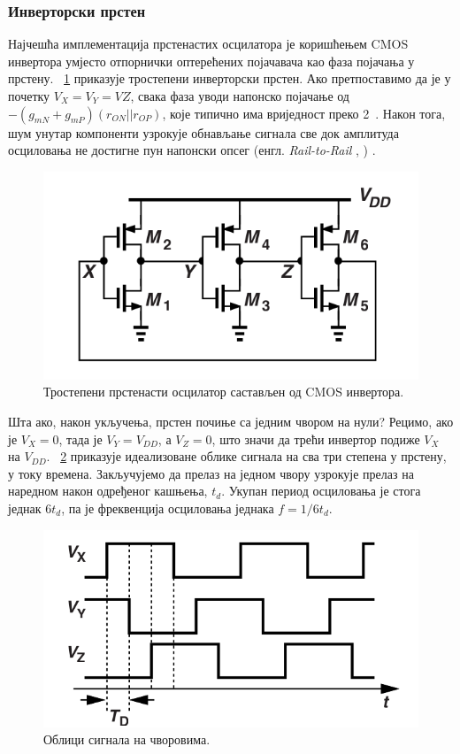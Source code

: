 \documentclass[master]{finthesis}
\makeatletter
\newcommand*{\engl}[2][\@empty]{%
    \edef\theacronym{#1}%
    (енгл. \foreignlanguage{english}{\emph{#2}%
    \ifx\theacronym\@empty \else , #1\fi})%
}
\makeatother
\begin{document}
\subsubsection{Инверторски прстен}
Најчешћа имплементација прстенастих осцилатора је коришћењем CMOS инвертора умјесто отпорнички оптерећених појачавача као фаза појачања у прстену. \figurename~\ref{inv_ring_osc_1} приказује тростепени инверторски прстен. Ако претпоставимо да је у почетку $V_{X} = V_{Y} = V{Z}$, свака фаза уводи напонско појачање од $-(g_{mN}+g_{mP})(r_{ON}||r_{OP})$, које типично има вриједност преко 2~\cite{Razavi:PLL_CMOS_2020}. Након тога, шум унутар компоненти узрокује обнављање сигнала све док амплитуда осциловања не достигне пун напонски опсег \engl{Rail-to-Rail}. \par
\begin{figure}[!ht]
	 \centering
	 \includegraphics[scale=0.4]{slike/inv_ring_osc_1.png}
	 \caption{Тростепени прстенасти осцилатор састављен од CMOS инвертора.}
	 \label{inv_ring_osc_1}
\end{figure}
Шта ако, након укључења, прстен почиње са једним чвором на нули? Рецимо, ако је $V_{X}=0$, тада је $V_{Y}=V_{DD}$, а $V_{Z}=0$, што значи да трећи инвертор подиже $V_{X}$ на $V_{DD}$. \figurename~\ref{inv_ring_osc_2} приказује идеализоване облике сигнала на сва три степена у прстену, у току времена. Закључујемо да прелаз на једном чвору узрокује прелаз на наредном након одређеног кашњења, $t_{d}$. Укупан период осциловања је стога једнак $6t_{d}$, па је фреквенција осциловања једнака $f=1/6t_{d}$.\par
\begin{figure}[!ht]
	 \centering
	 \includegraphics[scale=0.4]{slike/inv_ring_osc_2.png}
	 \caption{Облици сигнала на чворовима.}
	 \label{inv_ring_osc_2}
\end{figure}
\end{document}

